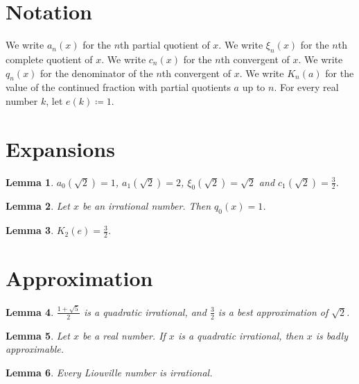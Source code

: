 \documentclass{article}
\newtheorem{lemma}{Lemma}
\begin{document}
\section{Notation}

We write $a_n(x)$ for the $n$th partial quotient of $x$.
We write $\xi_n(x)$ for the $n$th complete quotient of $x$.
We write $c_n(x)$ for the $n$th convergent of $x$.
We write $q_n(x)$ for the denominator of the $n$th convergent of $x$.
We write $K_n(a)$ for the value of the continued fraction with partial quotients $a$ up to $n$.
For every real number $k$, let $e(k)\coloneqq 1$.

\section{Expansions}

\begin{lemma}\label{root}
$a_0(\sqrt2)=1$, $a_1(\sqrt2)=2$, $\xi_0(\sqrt2)=\sqrt2$ and $c_1(\sqrt2)=\frac32$.
\end{lemma}

\begin{lemma}\label{denominator}
Let $x$ be an irrational number. Then $q_0(x)=1$.
\end{lemma}

\begin{lemma}\label{finite}
$K_2(e)=\frac32$.
\end{lemma}

\section{Approximation}

\begin{lemma}\label{golden}
$\frac{1+\sqrt5}{2}$ is a quadratic irrational, and $\frac32$ is a best approximation of $\sqrt2$.
\end{lemma}

\begin{lemma}\label{lagrange}
Let $x$ be a real number. If $x$ is a quadratic irrational, then $x$ is badly approximable.
\end{lemma}

\begin{lemma}\label{liouville}
Every Liouville number is irrational.
\end{lemma}
\end{document}
